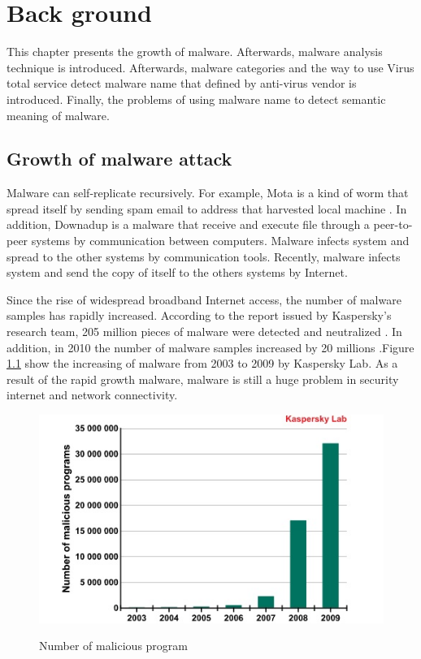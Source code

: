 
\chapter{Back ground}\label{chap:2}
This chapter presents the growth of malware. Afterwards, malware analysis technique is introduced. Afterwards, malware categories and the way to use Virus total service detect malware name that defined by anti-virus vendor is introduced. Finally, the problems of using malware name to detect semantic meaning of malware. 
%
%
\section{Growth of malware attack}
Malware can self-replicate recursively. For example, Mota is a kind of worm that spread itself by sending spam email to address that harvested local machine \cite{mota}. In addition, Downadup is a malware that receive and execute file through a peer-to-peer systems by communication between computers\cite{downadup}. Malware infects system and spread to the other systems by communication tools. Recently, malware infects system and send the copy of itself to the others systems by Internet.

Since the rise of widespread broadband Internet access, the number of malware samples has rapidly increased. According to the report issued by Kaspersky's research team, 205 million pieces of malware were detected and neutralized \cite{kaspersky1}. In addition, in 2010 the number of malware samples increased by 20 millions \cite{kaspersky}.Figure \ref{fig:kaspersky} show the increasing of malware from 2003 to 2009 by Kaspersky Lab. As a result of the rapid growth malware, malware is still a huge problem in security internet and network connectivity. 
\begin{figure}[h!]
\centering
\includegraphics[width=1\textwidth]{graph/kapersky.jpg}
\caption{Number of malicious program}\cite{kaspersky}
\label{fig:kaspersky}
\end{figure}

